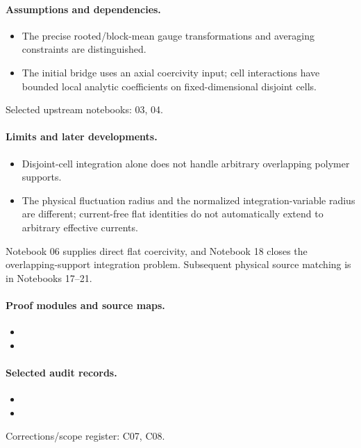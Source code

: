 \documentclass[11pt]{article}
\theoremstyle{remark}
\begin{document}
\paragraph{Assumptions and dependencies.}
\begin{itemize}
\item The precise rooted/block-mean gauge transformations and averaging constraints are distinguished.
\item The initial bridge uses an axial coercivity input; cell interactions have bounded local analytic coefficients on fixed-dimensional disjoint cells.
\end{itemize}

Selected upstream notebooks: 03, 04.\par

\paragraph{Limits and later developments.}
\begin{itemize}
\item Disjoint-cell integration alone does not handle arbitrary overlapping polymer supports.
\item The physical fluctuation radius and the normalized integration-variable radius are different; current-free flat identities do not automatically extend to arbitrary effective currents.
\end{itemize}

Notebook 06 supplies direct flat coercivity, and Notebook 18 closes the overlapping-support integration problem. Subsequent physical source matching is in Notebooks 17--21.

\paragraph{Proof modules and source maps.}
\begingroup\small
\begin{itemize}
\item {}
\item {}
\end{itemize}
\endgroup

\paragraph{Selected audit records.}
\begingroup\small
\begin{itemize}
\item {}
\item {}
\end{itemize}
\endgroup
Corrections/scope register: C07, C08.\par
\end{document}
